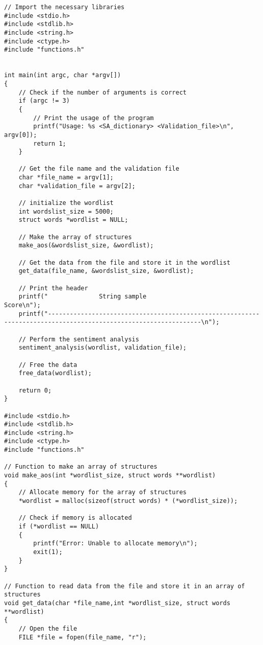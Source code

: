 \documentclass[a4paper,11pt]{article}
\theoremstyle{mytheor}
\begin{document}
\begin{lstlisting}[label={list:twelvth},caption=Appendix]
// Import the necessary libraries
#include <stdio.h>
#include <stdlib.h>
#include <string.h>
#include <ctype.h>
#include "functions.h"


int main(int argc, char *argv[])
{   
    // Check if the number of arguments is correct
    if (argc != 3)
    {
        // Print the usage of the program
        printf("Usage: %s <SA_dictionary> <Validation_file>\n", argv[0]);
        return 1;
    }

    // Get the file name and the validation file
    char *file_name = argv[1];
    char *validation_file = argv[2];

    // initialize the wordlist
    int wordslist_size = 5000;
    struct words *wordlist = NULL;
    
    // Make the array of structures
    make_aos(&wordslist_size, &wordlist);

    // Get the data from the file and store it in the wordlist
    get_data(file_name, &wordslist_size, &wordlist);

    // Print the header
    printf("              String sample                                                                               Score\n");
    printf("----------------------------------------------------------------------------------------------------------------\n");

    // Perform the sentiment analysis
    sentiment_analysis(wordlist, validation_file);

    // Free the data
    free_data(wordlist);

    return 0;
}

#include <stdio.h>
#include <stdlib.h>
#include <string.h>
#include <ctype.h>
#include "functions.h"

// Function to make an array of structures
void make_aos(int *wordlist_size, struct words **wordlist)
{   
    // Allocate memory for the array of structures
    *wordlist = malloc(sizeof(struct words) * (*wordlist_size));
    
    // Check if memory is allocated
    if (*wordlist == NULL)
    {
        printf("Error: Unable to allocate memory\n");
        exit(1);
    }
}

// Function to read data from the file and store it in an array of structures
void get_data(char *file_name,int *wordlist_size, struct words **wordlist)
{
    // Open the file
    FILE *file = fopen(file_name, "r");


\end{lstlisting}
\end{document}
